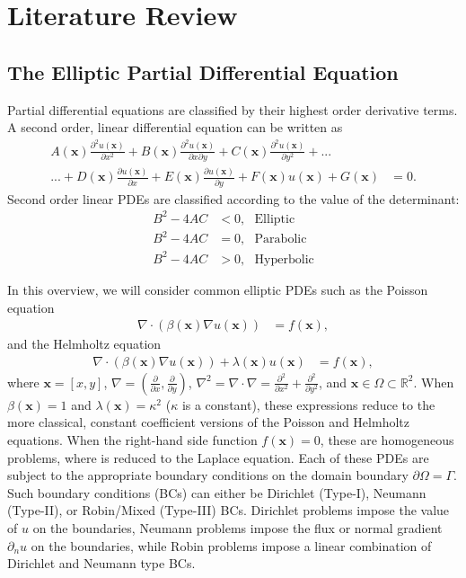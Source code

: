 \section{Literature Review}
\label{sec:lit-review}

\subsection{The Elliptic Partial Differential Equation}

Partial differential equations are classified by their highest order derivative terms. A second order, linear differential equation can be written as
\begin{align*}
    A(\textbf{x}) \frac{\partial^2 u(\textbf{x})}{\partial x^2} + B(\textbf{x}) \frac{\partial^2 u(\textbf{x})}{\partial x \partial y} + C(\textbf{x}) \frac{\partial^2 u(\textbf{x})}{\partial y^2} + ... \\
    ... + D(\textbf{x}) \frac{\partial u(\textbf{x})}{\partial x} + E(\textbf{x}) \frac{\partial u(\textbf{x})}{\partial y} + F(\textbf{x}) u(\textbf{x}) + G(\textbf{x}) &= 0.
\end{align*}
Second order linear PDEs are classified according to the value of the determinant: 
\begin{align*}
    B^2 - 4AC &< 0,\ \ \ \text{Elliptic} \\
    B^2 - 4AC &= 0,\ \ \ \text{Parabolic} \\
    B^2 - 4AC &> 0,\ \ \ \text{Hyperbolic}
\end{align*}

In this overview, we will consider common elliptic PDEs such as the Poisson equation
\begin{align}
    \nabla \cdot \left( \beta(\textbf{x}) \nabla u(\textbf{x}) \right) &= f(\textbf{x}),
    \label{eq:variable_poisson}
\end{align}
and the Helmholtz equation
\begin{align}
    \nabla \cdot \left( \beta(\textbf{x}) \nabla u(\textbf{x}) \right) + \lambda(\textbf{x}) u(\textbf{x}) &= f(\textbf{x}),
    \label{eq:variable_helmholtz}
\end{align}
where $\textbf{x} = [x, y]$, $\nabla = (\frac{\partial}{\partial x}, \frac{\partial}{\partial y})$, $\nabla^2 = \nabla \cdot \nabla = \frac{\partial^2}{\partial x^2} + \frac{\partial^2}{\partial y^2}$, and $\textbf{x} \in \Omega \subset \mathbb{R}^2$. When $\beta(\textbf{x}) = 1$ and $\lambda(\textbf{x}) = \kappa^2$ ($\kappa$ is a constant), these expressions reduce to the more classical, constant coefficient versions of the Poisson and Helmholtz equations. When the right-hand side function $f(\textbf{x}) = 0$, these are homogeneous problems, where  is reduced to the Laplace equation. Each of these PDEs are subject to the appropriate boundary conditions on the domain boundary $\partial \Omega = \Gamma$. Such boundary conditions (BCs) can either be Dirichlet (Type-I), Neumann (Type-II), or Robin/Mixed (Type-III) BCs. Dirichlet problems impose the value of $u$ on the boundaries, Neumann problems impose the flux or normal gradient $\partial_n u$ on the boundaries, while Robin problems impose a linear combination of Dirichlet and Neumann type BCs.

